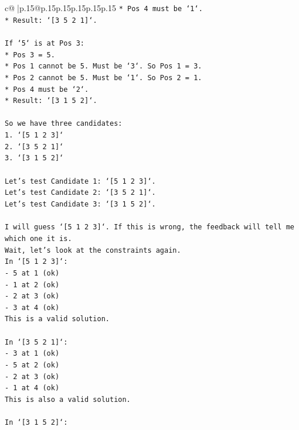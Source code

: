 \documentclass{article}
\begin{document}
{\begin{supertabular}{c@{$\;$}|p{.15\linewidth}@{}p{.15\linewidth}p{.15\linewidth}p{.15\linewidth}p{.15\linewidth}p{.15\linewidth}}
{{{\texttt{*   Pos 4 must be `1`.} \\
\texttt{*   Result: `{[}3 5 2 1{]}`.} \\
\\ 
\texttt{If `5` is at Pos 3:} \\
\texttt{*   Pos 3 = 5.} \\
\texttt{*   Pos 1 cannot be 5. Must be `3`. So Pos 1 = 3.} \\
\texttt{*   Pos 2 cannot be 5. Must be `1`. So Pos 2 = 1.} \\
\texttt{*   Pos 4 must be `2`.} \\
\texttt{*   Result: `{[}3 1 5 2{]}`.} \\
\\ 
\texttt{So we have three candidates:} \\
\texttt{1.  `{[}5 1 2 3{]}`} \\
\texttt{2.  `{[}3 5 2 1{]}`} \\
\texttt{3.  `{[}3 1 5 2{]}`} \\
\\ 
\texttt{Let's test Candidate 1: `{[}5 1 2 3{]}`.} \\
\texttt{Let's test Candidate 2: `{[}3 5 2 1{]}`.} \\
\texttt{Let's test Candidate 3: `{[}3 1 5 2{]}`.} \\
\\ 
\texttt{I will guess `{[}5 1 2 3{]}`. If this is wrong, the feedback will tell me which one it is.} \\
\texttt{Wait, let's look at the constraints again.} \\
\texttt{In `{[}5 1 2 3{]}`:} \\
\texttt{{-} 5 at 1 (ok)} \\
\texttt{{-} 1 at 2 (ok)} \\
\texttt{{-} 2 at 3 (ok)} \\
\texttt{{-} 3 at 4 (ok)} \\
\texttt{This is a valid solution.} \\
\\ 
\texttt{In `{[}3 5 2 1{]}`:} \\
\texttt{{-} 3 at 1 (ok)} \\
\texttt{{-} 5 at 2 (ok)} \\
\texttt{{-} 2 at 3 (ok)} \\
\texttt{{-} 1 at 4 (ok)} \\
\texttt{This is also a valid solution.} \\
\\ 
\texttt{In `{[}3 1 5 2{]}`:} \\
}}}
\end{supertabular}}
\end{document}
